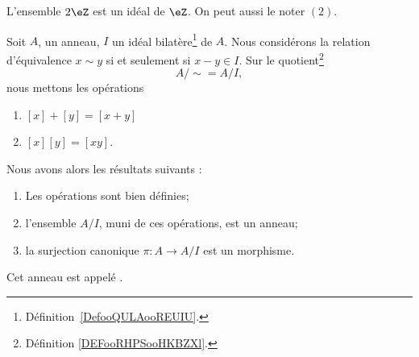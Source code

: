 \begin{example}
    L'ensemble \( 2\eZ\) est un idéal de \( \eZ\). On peut aussi le noter \( (2) \).
\end{example}

\begin{propositionDef}      \label{PROPooGXMRooTcUGbi}
    Soit \( A\), un anneau, \( I\) un idéal bilatère\footnote{Définition~\ref{DefooQULAooREUIU}.} de \( A\). Nous considérons la relation d'équivalence \( x\sim y\) si et seulement si \( x-y\in I\). Sur le quotient\footnote{Définition \ref{DEFooRHPSooHKBZXl}.}
    \begin{equation}
        A/\sim=A/I,
    \end{equation}
    nous mettons les opérations
    \begin{enumerate}
        \item
            \( [x]+[y]=[x+y]\)
        \item
            \( [x][y]=[xy]\).
    \end{enumerate}
    Nous avons alors les résultats suivants :
    \begin{enumerate}
        \item       \label{ITEMooEJPEooRKAqmS}
            Les opérations sont bien définies;
        \item       \label{ITEMooYBEGooTlHgNz}
            l'ensemble \( A/I\), muni de ces opérations, est un anneau;
        \item       \label{ITEMooLNRLooMkoWXZ}
            la surjection canonique \( \pi\colon A\to A/I\) est un morphisme.
    \end{enumerate}
    Cet anneau est appelé .
\end{propositionDef}

